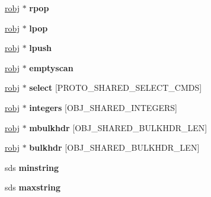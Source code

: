 \begin{DoxyCompactItemize}
\mbox{\label{structsharedObjectsStruct_a75a6df6556fd6b037ed475b4ba79443e}} 
\hyperlink{structredisObject}{robj} $\ast$ {\bfseries rpop}
\item 
\mbox{\label{structsharedObjectsStruct_a11bc6cd6ef46749ba36433e2c274f5d7}} 
\hyperlink{structredisObject}{robj} $\ast$ {\bfseries lpop}
\item 
\mbox{\label{structsharedObjectsStruct_a8fc12abf26346c398653be06e8b750cb}} 
\hyperlink{structredisObject}{robj} $\ast$ {\bfseries lpush}
\item 
\mbox{\label{structsharedObjectsStruct_aedf1a090f1704f5601e22ed66376362e}} 
\hyperlink{structredisObject}{robj} $\ast$ {\bfseries emptyscan}
\item 
\mbox{\label{structsharedObjectsStruct_a3e271c9b7f148eaf26d1d65d1288e6b2}} 
\hyperlink{structredisObject}{robj} $\ast$ {\bfseries select} \mbox{[}P\+R\+O\+T\+O\+\_\+\+S\+H\+A\+R\+E\+D\+\_\+\+S\+E\+L\+E\+C\+T\+\_\+\+C\+M\+DS\mbox{]}
\item 
\mbox{\label{structsharedObjectsStruct_a75f1d6deb59a196ed6a5a7e272687c60}} 
\hyperlink{structredisObject}{robj} $\ast$ {\bfseries integers} \mbox{[}O\+B\+J\+\_\+\+S\+H\+A\+R\+E\+D\+\_\+\+I\+N\+T\+E\+G\+E\+RS\mbox{]}
\item 
\mbox{\label{structsharedObjectsStruct_ab474585241dc4e793842e3e6b476f0ab}} 
\hyperlink{structredisObject}{robj} $\ast$ {\bfseries mbulkhdr} \mbox{[}O\+B\+J\+\_\+\+S\+H\+A\+R\+E\+D\+\_\+\+B\+U\+L\+K\+H\+D\+R\+\_\+\+L\+EN\mbox{]}
\item 
\mbox{\label{structsharedObjectsStruct_aae85d83b1bda5d16b7715738f016b2bf}} 
\hyperlink{structredisObject}{robj} $\ast$ {\bfseries bulkhdr} \mbox{[}O\+B\+J\+\_\+\+S\+H\+A\+R\+E\+D\+\_\+\+B\+U\+L\+K\+H\+D\+R\+\_\+\+L\+EN\mbox{]}
\item 
\mbox{\label{structsharedObjectsStruct_a7967b4e4fdf21e8b8ab79b8d79563bb9}} 
sds {\bfseries minstring}
\item 
\mbox{\label{structsharedObjectsStruct_aa1b6d309d04ce6eafc2f14c59bb5e3b3}} 
sds {\bfseries maxstring}
\end{DoxyCompactItemize}


